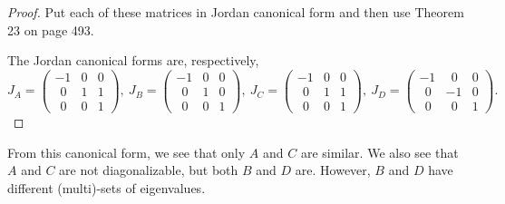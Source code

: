 \documentclass[10pt]{article}
\begin{document}
\begin{itemize}
\begin{proof}
Put each of these matrices in Jordan canonical form and then use
Theorem 23 on page 493.

The Jordan canonical forms are, respectively,
$$
J_A = \begin{pmatrix}
-1 & 0 & 0\\
~~0 & 1 & 1\\
~~0 & 0 & 1
\end{pmatrix}, \ 
J_B = \begin{pmatrix}
-1 & 0 & 0\\
~~0 & 1 & 0\\
~~0 & 0 & 1
\end{pmatrix}, \ 
J_C = \begin{pmatrix}
-1 & 0 & 0\\
~~0 & 1 & 1\\
~~0 & 0 & 1
\end{pmatrix}, \ 
J_D = \begin{pmatrix}
-1 & ~~0 & 0\\
~~0 & -1 & 0\\
~~0 & ~~0 & 1
\end{pmatrix}.  
$$
\end{proof}
From this canonical form, we see that only $A$ and $C$ are similar.
We also see that $A$ and $C$ are not diagonalizable, but both $B$
and $D$ are.  However, $B$ and $D$ have different (multi)-sets of eigenvalues.
\end{itemize}
\end{document}
